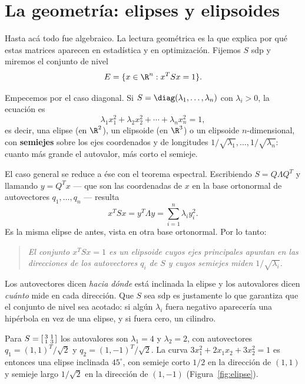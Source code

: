 \section{La geometría: elipses y elipsoides}
\label{sec:elipses}

Hasta acá todo fue algebraico. La lectura geométrica es la que explica por qué
estas matrices aparecen en estadística y en optimización. Fijemos $S$ sdp y
miremos el conjunto de nivel
\[
E = \{x\in\R^n : x^TSx = 1\} .
\]

Empecemos por el caso diagonal. Si $S=\diag(\lambda_1,\dots,\lambda_n)$ con
$\lambda_i>0$, la ecuación es
\[
\lambda_1x_1^2 + \lambda_2x_2^2 + \cdots + \lambda_nx_n^2 = 1 ,
\]
es decir, una elipse (en $\R^2$), un elipsoide (en $\R^3$) o un elipsoide
$n$-dimensional, con \textbf{semiejes} sobre los ejes coordenados y de
longitudes $1/\sqrt{\lambda_1},\dots,1/\sqrt{\lambda_n}$: cuanto más grande el
autovalor, más corto el semieje.

El caso general se reduce a ése con el teorema espectral. Escribiendo
$S=Q\Lambda Q^T$ y llamando $y=Q^Tx$ --- que son las coordenadas de $x$ en la
base ortonormal de autovectores $q_1,\dots,q_n$ --- resulta
\[
x^TSx = y^T\Lambda y = \sum_{i=1}^n\lambda_i y_i^2 .
\]
Es la misma elipse de antes, vista en otra base ortonormal. Por lo tanto:

\begin{quote}
  \emph{El conjunto $x^TSx=1$ es un elipsoide cuyos ejes principales apuntan en
  las direcciones de los autovectores $q_i$ de $S$ y cuyos semiejes miden
  $1/\sqrt{\lambda_i}$.}
\end{quote}

Los autovectores dicen \emph{hacia dónde} está inclinada la elipse y los
autovalores dicen \emph{cuánto} mide en cada dirección. Que $S$ sea sdp es
justamente lo que garantiza que el conjunto de nivel sea acotado: si algún
$\lambda_i$ fuera negativo aparecería una hipérbola en vez de una elipse, y si
fuera cero, un cilindro.

\begin{example}
Para $S=\begin{bsmallmatrix} 3 & 1\\ 1 & 3\end{bsmallmatrix}$ los autovalores
son $\lambda_1=4$ y $\lambda_2=2$, con autovectores $q_1=(1,1)^T/\sqrt2$ y
$q_2=(1,-1)^T/\sqrt2$. La curva $3x_1^2+2x_1x_2+3x_2^2=1$ es entonces una
elipse inclinada $45^\circ$, con semieje corto $1/2$ en la dirección de
$(1,1)$ y semieje largo $1/\sqrt2$ en la dirección de $(1,-1)$
(Figura~\ref{fig:elipse}).
\end{example}

